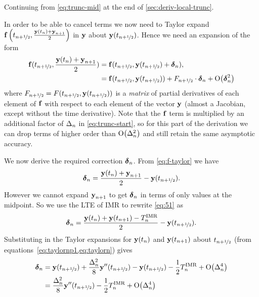 Continuing from \cref{eq:trunc-mid} at the end of \cref{sec:deriv-local-trunc}.

In order to be able to cancel terms we now need to Taylor expand ${\boldsymbol{\mathrm{f}}}\left( t_{n+\nicefrac{1}{2}}, \frac{\boldsymbol{\mathrm{y}}(t_n) + \boldsymbol{\mathrm{y}}_{n+1}}{2} \right)$ in $\boldsymbol{\mathrm{y}}$ about $\boldsymbol{\mathrm{y}}(t_{n+\nicefrac{1}{2}})$.
Hence we need an expansion of the form
\begin{equation}
  \begin{aligned}
    \fv(\thf, \frac{\yv(t_n) + \yv_{n+1}}{2}) &= \fv(\thf, \yvhf + \dyn), \\
    &= \fv(\thf, \yvhf) + \dfdyhf \cdot \dyn  + \order{\dyn^2}
    \label{eq:f-taylor}
  \end{aligned}
\end{equation}
where $F_{n+\nicefrac{1}{2}} = F(t_{n+\nicefrac{1}{2}}, \boldsymbol{\mathrm{y}}(t_{n+\nicefrac{1}{2}}))$ is a \emph{matrix} of partial derivatives of each element of ${\boldsymbol{\mathrm{f}}}$ with respect to each element of the vector $\boldsymbol{\mathrm{y}}$ (\ie almost a Jacobian, except without the time derivative).
Note that the ${\boldsymbol{\mathrm{f}}}$ term is multiplied by an additional factor of $\Delta_{n}$ in \cref{eq:trunc-start}, so for this part of the derivation we can drop terms of higher order than $\mathrm{O}{\left( \Delta_{n}^2 \right)}$ and still retain the same asymptotic accuracy.

We now derive the required correction $\mbox{\boldmath$\delta$}_{n}$.
From \cref{eq:f-taylor} we have
\begin{equation}
  \dyn = \frac{\yv(t_n) + \yv_{n+1}}{2} - \yvhf.
  \label{eq:51}
\end{equation}
However we cannot expand $\boldsymbol{\mathrm{y}}_{n+1}$ to get $\mbox{\boldmath$\delta$}_{n}$ in terms of only values at the midpoint.
So we use the LTE of IMR to rewrite \cref{eq:51} as
\begin{equation}
  \mbox{\boldmath$\delta$}_{n} = \frac{\boldsymbol{\mathrm{y}}(t_n) + \boldsymbol{\mathrm{y}}(t_{n+1}) - T_n^{\mathrm{IMR}}}{2} - \boldsymbol{\mathrm{y}}(t_{n+\nicefrac{1}{2}}).
\end{equation}
Substituting in the Taylor expansions for $\boldsymbol{\mathrm{y}}(t_n)$ and $\boldsymbol{\mathrm{y}}(t_{n+1})$ about $t_{n+\nicefrac{1}{2}}$ (from equations~\cref{eq:taylornp1,eq:taylorn}) gives
\begin{equation}
  \begin{aligned}
    \dyn &= \yvhf + \frac{\dtn^2}{8} \yvhf[''] - \yvhf - \frac{1}{2} \lte^\imr + \order{\dtn^4}\\
    &= \frac{\dtn^2}{8} \yvhf[''] - \frac{1}{2} \lte^\imr + \order{\dtn^4}
    \label{eq:dy-value}
  \end{aligned}
\end{equation}


